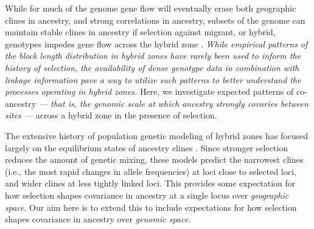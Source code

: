 \documentclass[11pt,letterpaper]{article}
\newcommand{\alisa}[1]{{\em \color{red} #1}}
\newcommand{\yb}[1]{{\em \color{magenta} #1}}
\begin{document}
While for much of the genome gene flow will eventually erase 
both geographic clines in ancestry, and strong correlations in ancestry,
subsets of the genome can maintain stable clines in ancestry if selection against migrant, or hybrid, genotypes impedes gene flow across the hybrid zone \citep{Barton1979a}. 
\yb{While empirical patterns of the block length distribution in hybrid zones have rarely been used to inform the history of selection,}  \alisa{the availability of dense genotype data in combination with linkage information pave a way to utilize such patterns to better understand the processes operating in hybrid zones. } %
Here, we investigate expected patterns of co-ancestry \yb{ --- that is, the genomic scale at which ancestry strongly covaries between sites --- } across a hybrid zone in the presence of selection. 


The extensive history of population genetic modeling of hybrid zones has focused largely on the equilibrium states of ancestry clines \citep{Barton1979a,Barton1986}.  
Since stronger selection reduces the amount of genetic mixing,
these models predict the narrowest clines 
(i.e., the most rapid changes in allele frequencies)
at loci close to selected loci, and wider clines at less tightly linked loci.
This provides some expectation for how selection shapes covariance in ancestry at a single locus over \emph{geographic space}.
Our aim here is to extend this to include expectations for how selection shapes covariance in ancestry over \emph{genomic space}.
\end{document}
